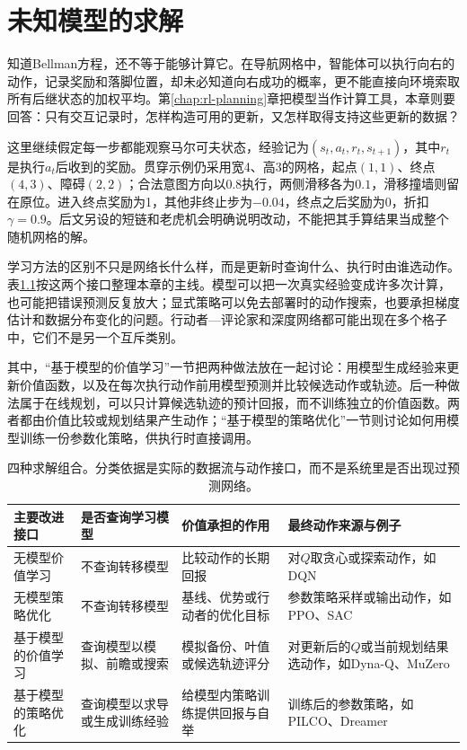 \chapter{未知模型的求解}
\label{chap:rl-learning}

知道Bellman方程，还不等于能够计算它。在导航网格中，智能体可以执行向右的动作，记录奖励和落脚位置，却未必知道向右成功的概率，更不能直接向环境索取所有后继状态的加权平均。第\ref{chap:rl-planning}章把模型当作计算工具，本章则要回答：只有交互记录时，怎样构造可用的更新，又怎样取得支持这些更新的数据？

这里继续假定每一步都能观察马尔可夫状态，经验记为$(s_t,a_t,r_t,s_{t+1})$，其中$r_t$是执行$a_t$后收到的奖励。贯穿示例仍采用宽4、高3的网格，起点$(1,1)$、终点$(4,3)$、障碍$(2,2)$；合法意图方向以$0.8$执行，两侧滑移各为$0.1$，滑移撞墙则留在原位。进入终点奖励为1，其他非终止步为$-0.04$，终点之后奖励为0，折扣$\gamma=0.9$。后文另设的短链和老虎机会明确说明改动，不能把其手算结果当成整个随机网格的解。

学习方法的区别不只是网络长什么样，而是更新时查询什么、执行时由谁选动作。表\ref{tab:rl-learning-four-interfaces}按这两个接口整理本章的主线。模型可以把一次真实经验变成许多次计算，也可能把错误预测反复放大；显式策略可以免去部署时的动作搜索，也要承担梯度估计和数据分布变化的问题。行动者—评论家和深度网络都可能出现在多个格子中，它们不是另一个互斥类别。

其中，“基于模型的价值学习”一节把两种做法放在一起讨论：用模型生成经验来更新价值函数，以及在每次执行动作前用模型预测并比较候选动作或轨迹。后一种做法属于在线规划，可以只计算候选轨迹的预计回报，而不训练独立的价值函数。两者都由价值比较或规划结果产生动作；“基于模型的策略优化”一节则讨论如何用模型训练一份参数化策略，供执行时直接调用。

\begin{table}[t]
  \centering
  \small
  \begin{tabularx}{\linewidth}{>{\raggedright\arraybackslash}p{26mm} >{\raggedright\arraybackslash}X >{\raggedright\arraybackslash}X >{\raggedright\arraybackslash}X}
    \toprule
    主要改进接口 & 是否查询学习模型 & 价值承担的作用 & 最终动作来源与例子 \\
    \midrule
    无模型价值学习 & 不查询转移模型 & 比较动作的长期回报 & 对$Q$取贪心或探索动作，如DQN \\
    无模型策略优化 & 不查询转移模型 & 基线、优势或行动者的优化目标 & 参数策略采样或输出动作，如PPO、SAC \\
    基于模型的价值学习 & 查询模型以模拟、前瞻或搜索 & 模拟备份、叶值或候选轨迹评分 & 对更新后的$Q$或当前规划结果选动作，如Dyna-Q、MuZero \\
    基于模型的策略优化 & 查询模型以求导或生成训练经验 & 给模型内策略训练提供回报与自举 & 训练后的参数策略，如PILCO、Dreamer \\
    \bottomrule
  \end{tabularx}
  \caption{四种求解组合。分类依据是实际的数据流与动作接口，而不是系统里是否出现过预测网络。}
  \label{tab:rl-learning-four-interfaces}
\end{table}

